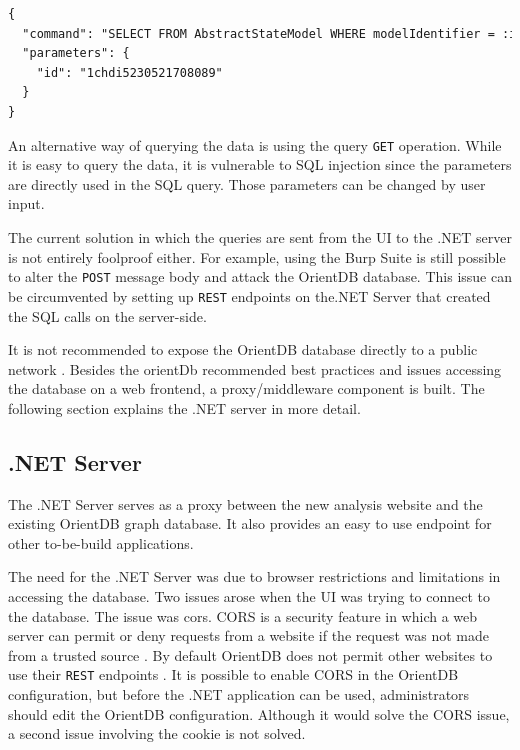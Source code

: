 \begin{lstlisting}[language=xml, caption=Get AbstractStateModel by the model identifier, label=code:example-body]
{
  "command": "SELECT FROM AbstractStateModel WHERE modelIdentifier = :id",
  "parameters": {
    "id": "1chdi5230521708089"
  }
}
\end{lstlisting}

An alternative way of querying the data is using the query \verb|GET| operation. While it is easy to query the data, it is vulnerable to SQL injection since the parameters are directly used in the SQL query. Those parameters can be changed by user input. 

The current solution in which the queries are sent from the UI to the .NET server is not entirely foolproof either. For example, using the Burp Suite is still possible to alter the \verb|POST| message body and attack the OrientDB database. This issue can be circumvented by setting up \verb|REST| endpoints on the.NET Server that created the SQL calls on the server-side.

It is not recommended to expose the OrientDB database directly to a public network \cite{orientdb-security}. Besides the orientDb recommended best practices and issues accessing the database on a web frontend, a proxy/middleware component is built. The following section explains the .NET server in more detail. 

\subsection{.NET Server} \label{sec:net-server}
The .NET Server serves as a proxy between the new \testar analysis website and the existing OrientDB graph database. It also provides an easy to use endpoint for other to-be-build applications.

The need for the .NET Server was due to browser restrictions and limitations in accessing the database. Two issues arose when the UI was trying to connect to the database. The issue was \acrfull{cors}. CORS is a security feature in which a web server can permit or deny requests from a website if the request was not made from a trusted source \cite{cors}. By default OrientDB does not permit other websites to use their \verb|REST| endpoints \cite{orientdb-webserver}. It is possible to enable CORS in the OrientDB configuration, but before the .NET application can be used, administrators should edit the OrientDB configuration. Although it would solve the CORS issue, a second issue involving the cookie is not solved.

